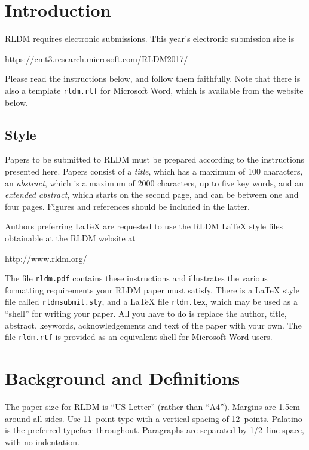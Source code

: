\documentclass[11pt]{article} %
\begin{document}
\section{Introduction}

RLDM requires electronic submissions.  This year's electronic
submission site is   
\begin{center}
   https://cmt3.research.microsoft.com/RLDM2017/
\end{center}

Please read the instructions below, and follow them faithfully. Note
that there is also a template \verb+rldm.rtf+ for Microsoft Word,
which is available from the website below.
\subsection{Style}

Papers to be submitted to RLDM must be prepared according to the
instructions presented here. Papers consist of a \emph{title}, which
has a maximum of 100 characters, an \emph{abstract}, which is a
maximum of 2000 characters, up to five key words, and an
\emph{extended abstract}, which starts on the second page, and can be
between one and four pages. Figures and references should be included
in the latter.

Authors preferring \LaTeX{} are requested to use the RLDM \LaTeX{}
style files obtainable at the RLDM website at
\begin{center}
   http://www.rldm.org/
\end{center}
The file \verb+rldm.pdf+ contains these instructions and illustrates
the various formatting requirements your RLDM paper must
satisfy. There is a \LaTeX{} style file called \verb+rldmsubmit.sty+,
and a \LaTeX{} file \verb+rldm.tex+, which may be used as a ``shell''
for writing your paper. All you have to do is replace the author,
title, abstract, keywords, acknowledgements and text of the paper with
your own. The file
\verb+rldm.rtf+ is provided as an equivalent shell for Microsoft Word users. 

\section{Background and Definitions}
\label{back_def}

The paper size for RLDM is ``US Letter'' (rather than ``A4''). Margins
are 1.5cm around all sides. Use 11~point type with a vertical spacing
of 12~points. Palatino is the preferred typeface throughout.
Paragraphs are separated by 1/2~line space, with no indentation.
\end{document}
